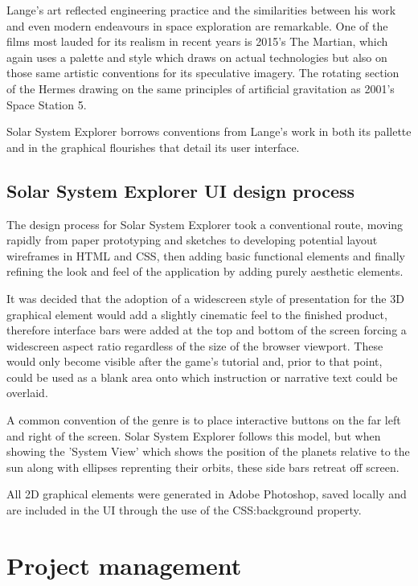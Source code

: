 \documentclass[twoside]{bhamthesis}
\begin{document}
Lange's art reflected engineering practice and the similarities between his work and even modern endeavours in space exploration are remarkable. One of the films most lauded for its realism in recent years is 2015's The Martian, which again uses a palette and style which draws on actual technologies but also on those same artistic conventions for its speculative imagery. The rotating section of the Hermes drawing on the same principles of artificial gravitation as 2001's Space Station 5.

Solar System Explorer borrows conventions from Lange's work in both its pallette and in the graphical flourishes that detail its user interface.

\subsection{Solar System Explorer UI design process}

The design process for Solar System Explorer took a conventional route, moving rapidly from paper prototyping and sketches to developing potential layout wireframes in HTML and CSS, then adding basic functional elements and finally refining the look and feel of the application by adding purely aesthetic elements.

It was decided that the adoption of a widescreen style of presentation for the 3D graphical element would add a slightly cinematic feel to the finished product, therefore interface bars were added at the top and bottom of the screen forcing a widescreen aspect ratio regardless of the size of the browser viewport. These would only become visible after the game's tutorial and, prior to that point, could be used as a blank area onto which instruction or narrative text could be overlaid.

A common convention of the genre is to place interactive buttons on the far left and right of the screen. Solar System Explorer follows this model, but when showing the 'System View' which shows the position of the planets relative to the sun along with ellipses reprenting their orbits, these side bars retreat off screen.

All 2D graphical elements were generated in Adobe Photoshop, saved locally and are included in the UI through the use of the CSS:background property.



\section{Project management}
\end{document}
